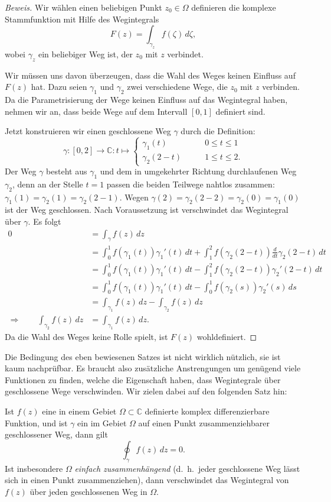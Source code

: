 \begin{proof}[Beweis]
Wir wählen einen beliebigen Punkt $z_0\in\Omega$ definieren die
komplexe Stammfunktion mit Hilfe des Wegintegrals
\[
F(z)=\int_{\gamma_z} f(\zeta)\,d\zeta,
\]
wobei $\gamma_z$ ein beliebiger Weg ist, der $z_0$ mit $z$ verbindet.

Wir müssen uns davon überzeugen, dass die Wahl des Weges keinen Einfluss
auf $F(z)$ hat.
Dazu seien $\gamma_1$ und $\gamma_2$ zwei verschiedene Wege, die
$z_0$ mit $z$ verbinden.
Da die Parametrisierung der Wege keinen Einfluss auf das Wegintegral haben,
nehmen wir an, dass beide Wege auf dem Intervall $[0,1]$ definiert sind.

Jetzt konstruieren wir einen geschlossene Weg $\gamma$ durch die
Definition:
\[
\gamma\colon[0,2]\to\mathbb C:t\mapsto
\begin{cases}
\gamma_1(t)&\qquad 0\le t\le 1\\
\gamma_2(2-t)&\qquad 1\le t\le 2.
\end{cases}
\]
Der Weg $\gamma$ besteht aus $\gamma_1$ und dem in umgekehrter Richtung
durchlaufenen Weg $\gamma_2$, denn an der Stelle $t=1$ passen die
beiden Teilwege nahtlos zusammen: $\gamma_1(1)=\gamma_2(1)=\gamma_2(2-1)$.
Wegen $\gamma(2)=\gamma_2(2-2)=\gamma_2(0)=\gamma_1(0)$ ist der
Weg geschlossen.
Nach Voraussetzung ist verschwindet das Wegintegral über $\gamma$.
Es folgt
\begin{align*}
0
&=
\int_{\gamma}f(z)\,dz
\\
&=
\int_0^1 f(\gamma_1(t))\gamma_1'(t)\,dt
+ \int_1^2f(\gamma_2(2-t))\frac{d}{dt}\gamma_2(2-t)\,dt
\\
&=
\int_0^1 f(\gamma_1(t))\gamma_1'(t)\,dt
- \int_1^2f(\gamma_2(2-t))\gamma_2'(2-t)\,dt
\\
&=
\int_0^1 f(\gamma_1(t))\gamma_1'(t)\,dt
- \int_0^1f(\gamma_2(s))\gamma_2'(s)\,ds
\\
&=
\int_{\gamma_1}f(z)\,dz - \int_{\gamma_2}f(z)\,dz
\\
\Rightarrow\qquad
\int_{\gamma_2}f(z)\,dz&=\int_{\gamma_1}f(z)\,dz.
\end{align*}
Da die Wahl des Weges keine Rolle spielt, ist $F(z)$ wohldefiniert.
\end{proof}

Die Bedingung des eben bewiesenen Satzes ist nicht wirklich nützlich,
sie ist kaum nachprüfbar.
Es braucht also zusätzliche Anstrengungen um genügend viele
Funktionen zu finden, welche die Eigenschaft haben, dass Wegintegrale
über geschlossene Wege verschwinden.
Wir zielen dabei auf den folgenden Satz hin:
\begin{satz}[Cauchy]
Ist $f(z)$ eine in einem Gebiet $\Omega\subset\mathbb C$ definierte
komplex differenzierbare Funktion, und ist $\gamma$ ein im Gebiet
$\Omega$ auf einen Punkt zusammenziehbarer geschlossener Weg, dann gilt
\[
\oint_{\gamma}f(z)\,dz=0.
\]
Ist insbesondere $\Omega$ {\em einfach zusammenhängend}
%
%
(d.~h.~jeder geschlossene Weg lässt sich in einen Punkt zusammenziehen),
dann verschwindet das Wegintegral von $f(z)$ über jeden geschlossenen
Weg in $\Omega$.
\end{satz}


